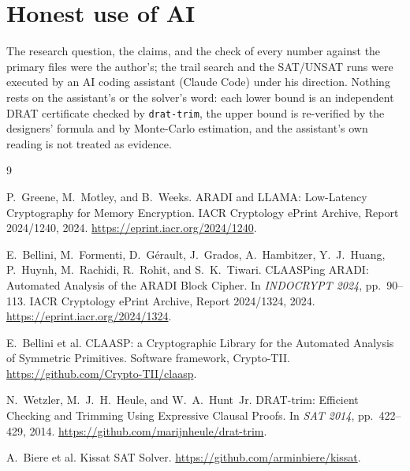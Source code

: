 \documentclass[11pt]{article}
\begin{document}
\section{Honest use of AI}

The research question, the claims, and the check of every number against the primary files were the author's; the trail search and the SAT/UNSAT runs were executed by an AI coding assistant (Claude Code) under his direction. Nothing rests on the assistant's or the solver's word: each lower bound is an independent DRAT certificate checked by \texttt{drat-trim}, the upper bound is re-verified by the designers' formula and by Monte-Carlo estimation, and the assistant's own reading is not treated as evidence.

\begin{thebibliography}{9}

P.~Greene, M.~Motley, and B.~Weeks.
\newblock ARADI and LLAMA: Low-Latency Cryptography for Memory Encryption.
\newblock IACR Cryptology ePrint Archive, Report 2024/1240, 2024.
\newblock \url{https://eprint.iacr.org/2024/1240}.

E.~Bellini, M.~Formenti, D.~G\'erault, J.~Grados, A.~Hambitzer, Y.~J.~Huang,
P.~Huynh, M.~Rachidi, R.~Rohit, and S.~K.~Tiwari.
\newblock CLAASPing ARADI: Automated Analysis of the ARADI Block Cipher.
\newblock In \emph{INDOCRYPT 2024}, pp.~90--113.
\newblock IACR Cryptology ePrint Archive, Report 2024/1324, 2024.
\newblock \url{https://eprint.iacr.org/2024/1324}.

E.~Bellini et al.
\newblock CLAASP: a Cryptographic Library for the Automated Analysis of
Symmetric Primitives.
\newblock Software framework, Crypto-TII.
\newblock \url{https://github.com/Crypto-TII/claasp}.

N.~Wetzler, M.~J.~H.~Heule, and W.~A.~Hunt~Jr.
\newblock DRAT-trim: Efficient Checking and Trimming Using Expressive Clausal
Proofs.
\newblock In \emph{SAT 2014}, pp.~422--429, 2014.
\newblock \url{https://github.com/marijnheule/drat-trim}.

A.~Biere et al.
\newblock Kissat SAT Solver.
\newblock \url{https://github.com/arminbiere/kissat}.

\end{thebibliography}
\end{document}
